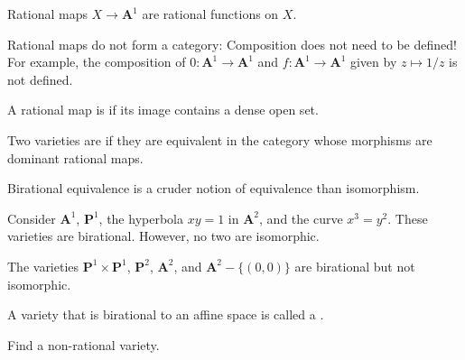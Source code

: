 \documentclass [11 pt, oneside] {article}
\begin{document}
\begin{example}[ ]\label{}
Rational maps $X\longrightarrow \mathbf{A}^1$ are rational functions on $X$.
\end{example}

Rational maps do not form a category: Composition does not need to be defined! For example, the composition of $0:\mathbf{A}^1\longrightarrow \mathbf{A}^1$ and $f:\mathbf{A}^1\longrightarrow \mathbf{A}^1$ given by $z\longmapsto 1/z$ is not defined.

\begin{definition}[ ]\label{}
A rational map is  if its image contains a dense open set.
\end{definition}

\begin{definition}
	Two varieties are  if they are equivalent in the category whose morphisms are dominant rational maps.
\end{definition}

\begin{remark}
	Birational equivalence is a cruder notion of equivalence than isomorphism.
\end{remark}

\begin{example}[ ]\label{}
Consider $\mathbf{A}^1$, $\mathbf{P}^1 $, the hyperbola $xy=1$ in $\mathbf{A}^2$, and the curve $x^3=y^2$. These varieties are birational. However, no two are isomorphic.

The varieties $\mathbf{P}^1\times \mathbf{P}^1$, $\mathbf{P}^2$, $\mathbf{A}^2$, and $\mathbf{A}^2-\{(0,0)\}$ are birational but not isomorphic.
\end{example}

\begin{remark}
	A variety that is birational to an affine space is called a .
\end{remark}

\begin{problem}
	Find a non-rational variety.
\end{problem}
\end{document}

